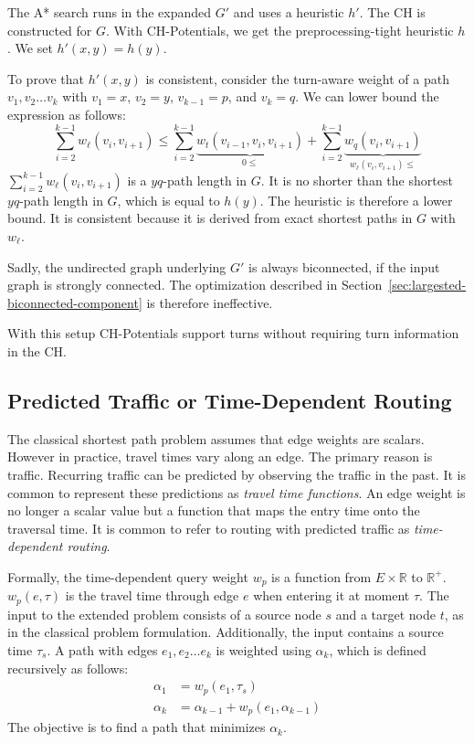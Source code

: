 \documentclass[a4paper,USenglish,cleveref, autoref, thm-restate]{lipics-v2019}
\begin{document}
The A* search runs in the expanded $G'$ and uses a heuristic $h'$.
The CH is constructed for $G$.
With CH-Potentials, we get the preprocessing-tight heuristic $h$.
We set $h'(x,y) = h(y)$.

To prove that $h'(x,y)$ is consistent, consider the turn-aware weight of a path $v_1,v_2\ldots v_k$ with $v_1=x$, $v_2=y$, $v_{k-1}=p$, and $v_k=q$.
We can lower bound the expression as follows:
\[
\sum_{i=2}^{k-1} w_\ell(v_i,v_{i+1}) \le \sum_{i=2}^{k-1} \underbrace{w_t(v_{i-1},v_i,v_{i+1})}_{0\le} + \sum_{i=2}^{k-1} \underbrace{w_q(v_i,v_{i+1})}_{w_\ell(v_i,v_{i+1})\le}
\]
$\sum_{i=2}^{k-1} w_\ell(v_i,v_{i+1})$ is a $yq$-path length in $G$.
It is no shorter than the shortest $yq$-path length in $G$, which is equal to $h(y)$.
The heuristic is therefore a lower bound.
It is consistent because it is derived from exact shortest paths in $G$ with $w_\ell$.

Sadly, the undirected graph underlying $G'$ is always biconnected, if the input graph is strongly connected.
The optimization described in Section~\ref{sec:largested-biconnected-component} is therefore ineffective.

With this setup CH-Potentials support turns without requiring turn information in the CH.

\subsection{Predicted Traffic or Time-Dependent Routing}
\label{sec:predicted-traffic}

The classical shortest path problem assumes that edge weights are scalars.
However in practice, travel times vary along an edge.
The primary reason is traffic.
Recurring traffic can be predicted by observing the traffic in the past.
It is common \cite{bgsv-mtdtt-13,bdpw-dtdrp-16,swz-sfert-19} to represent these predictions as \emph{travel time functions}.
An edge weight is no longer a scalar value but a function that maps the entry time onto the traversal time.
It is common to refer to routing with predicted traffic as \emph{time-dependent routing}.

Formally, the time-dependent query weight $w_p$ is a function from $E\times \mathbb{R}$ to $\mathbb{R}^+$.
$w_p(e, \tau)$ is the travel time through edge $e$ when entering it at moment $\tau$.
The input to the extended problem consists of a source node $s$ and a target node $t$, as in the classical problem formulation.
Additionally, the input contains a source time $\tau_s$.
A path with edges $e_1,e_2\ldots e_k$ is weighted using $\alpha_k$, which is defined recursively as follows:\[
\begin{split}
\alpha_{1} & = w_p(e_1, \tau_s) \\
\alpha_{k} & = \alpha_{k-1} + w_p(e_1, \alpha_{k-1})
\end{split}
\]
The objective is to find a path that minimizes $\alpha_k$.
\end{document}
